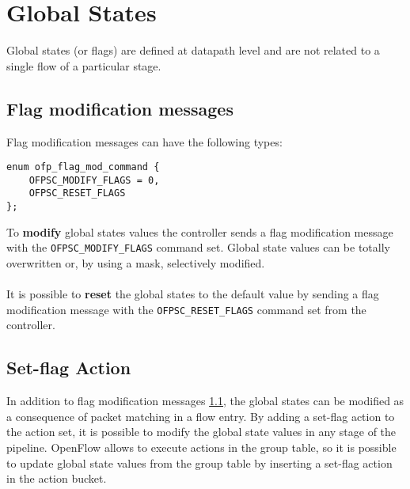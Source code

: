
\chapter{Global States}
\label{chap:global_states}
Global states (or flags) are defined at datapath level and are not related to a single flow of a particular stage.

\section{Flag modification messages}
\label{sec:flag_mod_msg}

Flag modification messages can have the following types:
\scriptsize\begin{verbatim}
enum ofp_flag_mod_command { 
    OFPSC_MODIFY_FLAGS = 0,
    OFPSC_RESET_FLAGS
};
\end{verbatim}\normalsize
\noindent
To \textbf{modify} global states values the controller sends a flag modification message with the \texttt{OFPSC\_MODIFY\_FLAGS} command set. Global state values can be totally overwritten or, by using a mask, selectively modified.
\\\\It is possible to \textbf{reset} the global states to the default value by sending a flag modification message with the \texttt{OFPSC\_RESET\_FLAGS} command set from the controller.

\section{Set-flag Action}
\label{sec:act_set_flag}
In addition to flag modification messages \ref{sec:flag_mod_msg}, the global states can be modified as a consequence of packet matching in a flow entry. By adding a set-flag action to the action set, it is possible to modify the global state values in any stage of the pipeline.
OpenFlow allows to execute actions in the group table, so it is possible to update global state values from the group table by inserting a set-flag action in the action bucket.